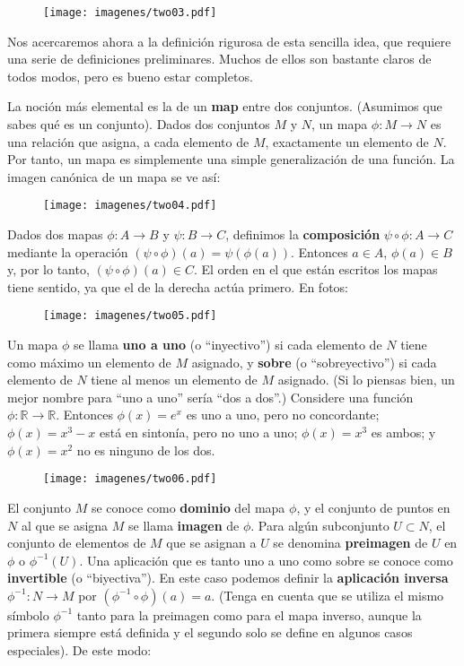 \documentclass[11pt,b5paper,openany,twoside]{book}
\begin{document}
\begin{figure}[h]
\centering
\texttt{[image: imagenes/two03.pdf]}
\end{figure}

Nos acercaremos ahora a la definición rigurosa de esta sencilla idea, que requiere una serie de definiciones preliminares.
Muchos de ellos son bastante claros de todos modos, pero es bueno estar completos.

La noción más elemental es la de un {\bf map} entre dos conjuntos.
(Asumimos que sabes qué es un conjunto).
Dados dos conjuntos $M$ y $N$, un mapa $\phi: M\rightarrow N$ es una relación que asigna, a cada elemento de $M$, exactamente un elemento de $N$.
Por tanto, un mapa es simplemente una simple generalización de una función.
La imagen canónica de un mapa se ve así:

\begin{figure}[h]
\centering
\texttt{[image: imagenes/two04.pdf]}
\end{figure}

Dados dos mapas $\phi: A\rightarrow B$ y $\psi:B\rightarrow C$, definimos la {\bf composición} $\psi\circ\phi: A\rightarrow C$ mediante la operación $(\psi\circ\phi)(a)=\psi(\phi(a))$.
Entonces $a\in A$, $\phi(a)\in B$ y, por lo tanto, $(\psi\circ\phi)(a)\in C$.
El orden en el que están escritos los mapas tiene sentido, ya que el de la derecha actúa primero.
En fotos:

\begin{figure}[h]
\centering
\texttt{[image: imagenes/two05.pdf]}
\end{figure}

Un mapa $\phi$ se llama {\bf uno a uno} (o ``inyectivo'') si cada elemento de $N$ tiene como máximo un elemento de $M$ asignado, y {\bf sobre} (o ``sobreyectivo'') si cada elemento de $N$ tiene al menos un elemento de $M$ asignado.
(Si lo piensas bien, un mejor nombre para ``uno a uno'' sería ``dos a dos''.)
Considere una función $\phi: \mathbb{R}\rightarrow\mathbb{R}$.
Entonces $\phi(x)=e^x$ es uno a uno, pero no concordante; $\phi(x)=x^3-x$ está en sintonía, pero no uno a uno; $\phi(x)=x^3$ es ambos; y $\phi(x)=x^2$ no es ninguno de los dos.

\begin{figure}[h]
\centering
\texttt{[image: imagenes/two06.pdf]}
\end{figure}

El conjunto $M$ se conoce como {\bf dominio} del mapa $\phi$, y el conjunto de puntos en $N$ al que se asigna $M$ se llama {\bf imagen} de $\phi$.
Para algún subconjunto $U\subset N$, el conjunto de elementos de $M$ que se asignan a $U$ se denomina {\bf preimagen} de $U$ en $\phi$ o $\phi^{-1}(U)$.
Una aplicación que es tanto uno a uno como sobre se conoce como {\bf invertible} (o ``biyectiva'').
En este caso podemos definir la {\bf aplicación inversa} $\phi^{-1}:N\rightarrow M$ por $(\phi^{-1}\circ\phi)(a)=a$.
(Tenga en cuenta que se utiliza el mismo símbolo $\phi^{-1}$ tanto para la preimagen como para el mapa inverso, aunque la primera siempre está definida y el segundo solo se define en algunos casos especiales).
De este modo:
\end{document}
